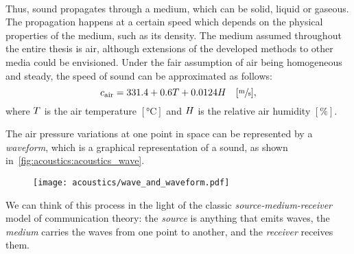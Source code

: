 \\Thus, sound propagates through a medium, which can be solid, liquid or gaseous.
The propagation happens at a certain speed which depends on the physical properties of the medium, such as its density.
The medium assumed throughout the entire thesis is air, although extensions of the developed methods to other media could be envisioned.
Under the fair assumption of air being homogeneous and steady, the speed of sound can be approximated as follows:
\begin{equation}
    c_\text{air} =  331.4 + 0.6T + 0.0124H \hspace{1em} [\sfrac{\si{\metre}}{\si{\second}}]
    ,
\end{equation}
where $T$ is the air temperature $[\si{\celsius}]$ and $H$ is the relative air humidity $[\%]$.

\mynewline
The air pressure variations at one point in space can be represented by a \textit{waveform}, which is a graphical representation of a sound, as shown in~\cref{fig:acoustics:acoustics_wave}.
\begin{figure}[h]
    \texttt{[image: acoustics/wave\_and\_waveform.pdf]}
\end{figure}

\mynewline
We can think of this process in the light of the classic \textit{source-medium-receiver} model of communication theory:
the \textit{source} is anything that emits waves, the \textit{medium} carries the waves from one point to another, and the \textit{receiver} receives them.

